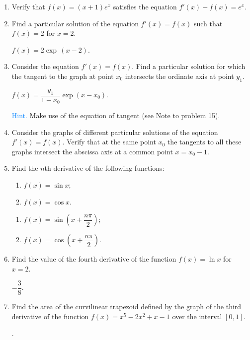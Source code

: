 \begin{enumerate}[label=\textcolor{IndianRed}{Problem \arabic*},leftmargin=2cm]
\item Verify that $f (x) = (x +1) e^{x}$ satisfies the equation $f'(x)- f(x)=e^{x}$.

\item Find a particular solution of the equation $f' (x) = f (x)$ such that $f(x)= 2$ for $x=2$. 

\Answer $f (x)= 2 \exp \, (x- 2)$.

\item Consider the equation $f' (x) = f (x)$. Find a particular solution for which the tangent to the graph at point $x_{0}$ intersects the ordinate axis at point $y_{1}$.

\Answer $f (x) = \dfrac{y_{1}}{1 - x_{0}} \exp (x - x_{0})$.

\textcolor{DodgerBlue}{Hint.} Make use of the equation of tangent (see Note to problem 15).

\item Consider the graphs of different particular solutions of the equation $f' (x) = f (x)$. Verify that at the same point $x_{0}$ the tangents to all these graphs intersect the abscissa axis at a common point $x = x_{0} -1$.

\item  Find the $n$th derivative of the following functions: 
\begin{enumerate}[label=(\alph*)]
 \item $f(x) = \sin x$;
 \item $f(x) = \cos x$.
 \end{enumerate}

\Answer  \begin{enumerate}[label=(\alph*)]
 \item $f(x) = \sin \left( x + \dfrac{n \pi}{2} \right)$;
 \item $f(x) = \cos \left( x + \dfrac{n \pi}{2} \right)$.
\end{enumerate}


\item  Find the value of the fourth derivative of the function $f (x) = \ln x$ for $x = 2$.

\Answer $ - \dfrac{3}{8}$.

\item Find the area of the curvilinear trapezoid defined by the graph of the third derivative of the function $f (x) = x^{5} - 2 x^{2} + x -1 $ over the interval $[0, 1]$.

.

\end{enumerate}
\cleardoublepage